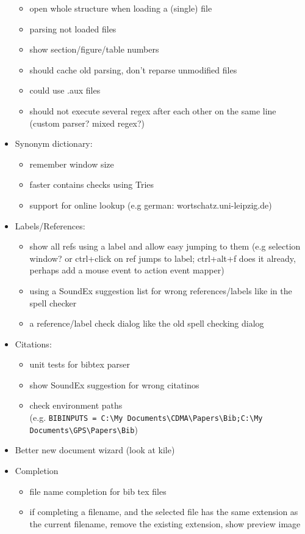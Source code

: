 \documentclass[10pt,a4paper,portrait]{article}
\begin{document}
\begin{itemize}
\begin{itemize}
		\item open whole structure when loading a (single)	 file
		\item parsing not loaded files
		\item show section/figure/table numbers
		\item should cache old parsing, don't reparse unmodified files
		\item could use .aux files
		\item should not execute several regex after each other on the same line (custom parser? mixed regex?)	
	\end{itemize}
	\item Synonym dictionary: \begin{itemize}
		\item remember window size
		\item faster contains checks using Tries
		\item support for online lookup (e.g german: wortschatz.uni-leipzig.de)
	\end{itemize}
	\item Labels/References: \begin{itemize}
		\item show all refs using a label and allow easy jumping to them (e.g selection window? or ctrl+click on ref jumps to label; ctrl+alt+f does it already, perhaps add a mouse event to action event mapper)
		\item using a SoundEx suggestion list for wrong references/labels like in the spell checker
		\item a reference/label check dialog like the old spell checking dialog
	\end{itemize}
	\item Citations: \begin{itemize}
		\item unit tests for bibtex parser
		\item show SoundEx suggestion for wrong citatinos
		\item check environment paths\\(e.g. \verb+BIBINPUTS = C:\My Documents\CDMA\Papers\Bib;C:\My Documents\GPS\Papers\Bib+)
	\end{itemize}
	\item Better new document wizard (look at kile)
	\item Completion \begin{itemize}
	\item file name completion for bib tex files
	\item if completing a filename, and the selected file has the same extension as the current filename, remove the existing extension, show preview image

\end{itemize}
\end{itemize}
\end{document}
